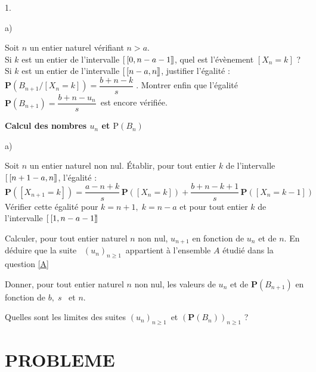 \documentclass[11pt]{article}%
\begin{document}
\begin{noliste}{1.}
\begin{noliste}{a)}
\item Soit $n$ un entier naturel vérifiant $n>a$. \\
Si $k$ est un entier de l'intervalle $[ \
\hspace{-0.15em}[0,n-a-1]\hspace{-0.13em}]$, quel est l'évènement
$[X_{n} = k]$ ? \\
Si $k$ est un entier de l'intervalle $[ \
\hspace{-0.15em}[n-a,n]\hspace{-0.13em}]$, justifier l'égalité :
$\mathbf{P}(B_{n + 1}/[X_{n} = k]) = \dfrac{b + n-k}{s}\;. $ Montrer
enfin que l'égalité \ $\mathbf{P}(B_{n + 1}) = \dfrac{b + n-u_{n}}{s}
$\ est encore vérifiée.
\end{noliste}

\item \textbf{Calcul des nombres $u_{n}$ et $\text{P}(B_{n})$}

\begin{noliste}{a)}
 \setlength{\itemsep}{2mm}
\item Soit $n$ un entier naturel non nul. Établir, pour tout entier $k$
de
l'intervalle $[ \ \hspace{-0.15em}[n + 1-a,n]\hspace{-0.13em}]$,
l'égalité : 
\[
\mathbf{P}([X_{n + 1} = k]) = \dfrac{a-n + k}{s}\,\mathbf{P}([X_{n} =
k]) + \dfrac{b + n-k + 1}{s}\,\mathbf{P}([X_{n} = k-1])
\]
Vérifier cette égalité pour $k = n + 1,\;k = n-a$ et pour tout entier
$k$ de
l'intervalle $[ \ \hspace{-0.15em}[1,n-a-1]\hspace{-0.13em}]$\.

\item Calculer, pour tout entier naturel $n$ non nul, $u_{n + 1}$ en
fonction
de $u_{n}$ et de $n$. En déduire que la suite \ $(u_{n})_{n\geq 1}$\
appartient à l'ensemble $A$ étudié dans la question \ref{A}

\item Donner, pour tout entier naturel $n$ non nul, les valeurs de
$u_{n}$
et de $\mathbf{P}(B_{n + 1})$ en fonction de $b,\;s$ \ et $n$.

\item Quelles sont les limites des suites $(u_{n})_{n\geq 1}$\ et
$(\mathbf{P}(B_{n}))_{n\geq 1}$ ?
\end{noliste}
\end{noliste}

\section*{PROBLEME}
\end{document}
